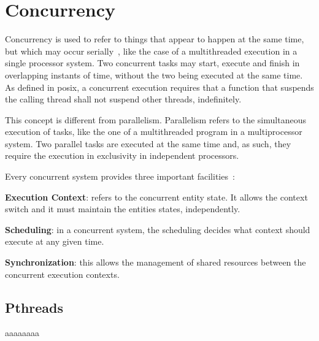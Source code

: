 %
\section{Concurrency}%
\label{sec:concurrency}
Concurrency is used to refer to things that appear to happen at the same time,
but which may occur serially~\cite{buttlar1996pthreads}, like the case of a
multithreaded execution in a single processor system.
Two concurrent tasks may start, execute and finish in overlapping instants of
time, without the two being executed at the same time.
As defined in \gls{posix}, a concurrent execution requires that a function that
suspends the calling thread shall not suspend other threads, indefinitely.

This concept is different from parallelism. Parallelism refers to the
simultaneous execution of tasks, like the one of a multithreaded program in a
multiprocessor system.
Two parallel tasks are executed at the same time and, as such, they require
the execution in exclusivity in independent processors.

Every concurrent system provides three important facilities~\cite{buttlar1996pthreads}:
\begin{item-c}
\item \textbf{Execution Context}: refers to the concurrent entity state. It
  allows the context switch and it must maintain the entities states,
  independently.
\item \textbf{Scheduling}: in a concurrent system, the scheduling decides what
  context should execute at any given time.
\item \textbf{Synchronization}: this allows the management of shared resources
  between the concurrent execution contexts.
\end{item-c}

\subsection{Pthreads}
\label{sec:pthreads}
aaaaaaaa





